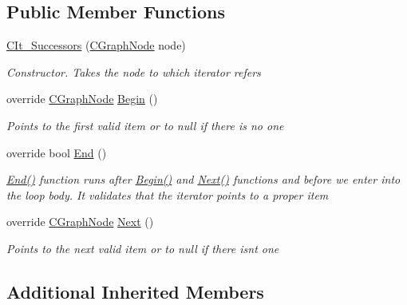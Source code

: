 \subsection*{Public Member Functions}
\begin{DoxyCompactItemize}
\item 
\hyperlink{class_graph_library_1_1_c_it___successors_afe5463ca23a259bb46b425f4f95b59c6}{C\+It\+\_\+\+Successors} (\hyperlink{class_graph_library_1_1_c_graph_node}{C\+Graph\+Node} node)
\begin{DoxyCompactList}\small\item\em Constructor. Takes the node to which iterator refers \end{DoxyCompactList}\item 
override \hyperlink{class_graph_library_1_1_c_graph_node}{C\+Graph\+Node} \hyperlink{class_graph_library_1_1_c_it___successors_ab13b972da76d0f8972114e8d376ba68c}{Begin} ()
\begin{DoxyCompactList}\small\item\em Points to the first valid item or to null if there is no one \end{DoxyCompactList}\item 
override bool \hyperlink{class_graph_library_1_1_c_it___successors_a8645c9047b2910e2c3bd246f8745773b}{End} ()
\begin{DoxyCompactList}\small\item\em \hyperlink{class_graph_library_1_1_c_it___successors_a8645c9047b2910e2c3bd246f8745773b}{End()} function runs after \hyperlink{class_graph_library_1_1_c_it___successors_ab13b972da76d0f8972114e8d376ba68c}{Begin()} and \hyperlink{class_graph_library_1_1_c_it___successors_abeba92b544a86d4385e9120289801df3}{Next()} functions and before we enter into the loop body. It validates that the iterator points to a proper item \end{DoxyCompactList}\item 
override \hyperlink{class_graph_library_1_1_c_graph_node}{C\+Graph\+Node} \hyperlink{class_graph_library_1_1_c_it___successors_abeba92b544a86d4385e9120289801df3}{Next} ()
\begin{DoxyCompactList}\small\item\em Points to the next valid item or to null if there isn\textquotesingle{}t one \end{DoxyCompactList}\end{DoxyCompactItemize}
\subsection*{Additional Inherited Members}


